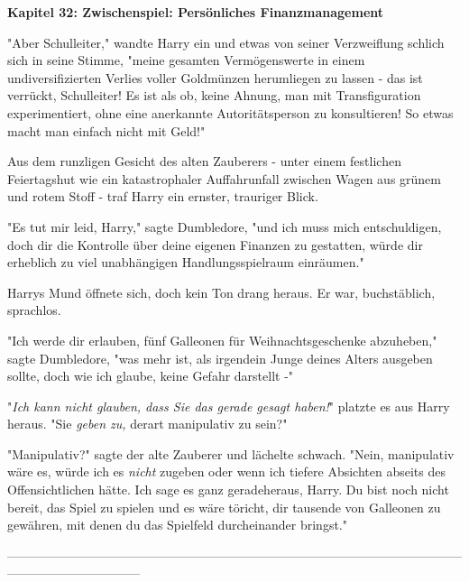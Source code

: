 

\hypertarget{zwischenspiel-persuxf6nliches-finanzmanagement}{%

\textbf{Kapitel 32: Zwischenspiel: Persönliches Finanzmanagement\\ }

"Aber Schulleiter," wandte Harry ein und etwas von seiner Verzweiflung schlich sich in seine Stimme, "meine gesamten Vermögenswerte in einem undiversifizierten Verlies voller Goldmünzen herumliegen zu lassen - das ist verrückt, Schulleiter! Es ist als ob, keine Ahnung, man mit Transfiguration experimentiert, ohne eine anerkannte Autoritätsperson zu konsultieren! So etwas macht man einfach nicht mit Geld!"

Aus dem runzligen Gesicht des alten Zauberers - unter einem festlichen Feiertagshut wie ein katastrophaler Auffahrunfall zwischen Wagen aus grünem und rotem Stoff - traf Harry ein ernster, trauriger Blick.

"Es tut mir leid, Harry," sagte Dumbledore, "und ich muss mich entschuldigen, doch dir die Kontrolle über deine eigenen Finanzen zu gestatten, würde dir erheblich zu viel unabhängigen Handlungsspielraum einräumen."

Harrys Mund öffnete sich, doch kein Ton drang heraus. Er war, buchstäblich, sprachlos.

"Ich werde dir erlauben, fünf Galleonen für Weihnachtsgeschenke abzuheben," sagte Dumbledore, "was mehr ist, als irgendein Junge deines Alters ausgeben sollte, doch wie ich glaube, keine Gefahr darstellt -"

"\emph{Ich kann nicht glauben, dass Sie das gerade gesagt haben!}" platzte es aus Harry heraus. "Sie \emph{geben zu,} derart manipulativ zu sein?"

"Manipulativ?" sagte der alte Zauberer und lächelte schwach. "Nein, manipulativ wäre es, würde ich es \emph{nicht} zugeben oder wenn ich tiefere Absichten abseits des Offensichtlichen hätte. Ich sage es ganz geradeheraus, Harry. Du bist noch nicht bereit, das Spiel zu spielen und es wäre töricht, dir tausende von Galleonen zu gewähren, mit denen du das Spielfeld durcheinander bringst."

--------------------------------------------------------------------------------------------------------------------------------------------

}
